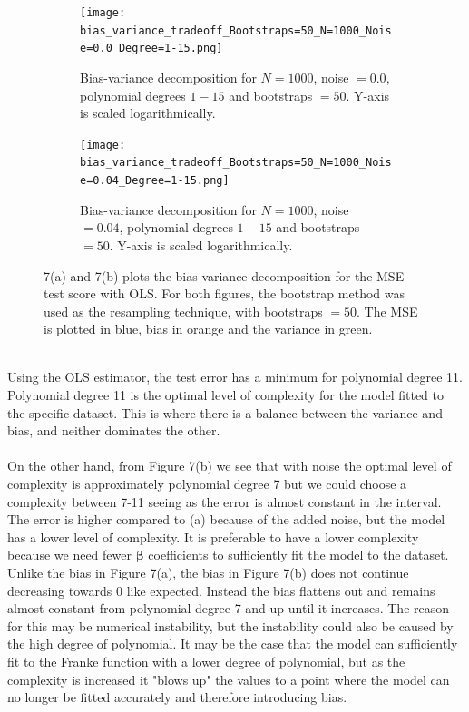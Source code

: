 \documentclass[a4paper,twocolumn]{article}
\newcommand{\B}{\boldsymbol{\beta}}
\begin{document}
\begin{figure}[ht]
    \centering
    \begin{subfigure}[b]{0.9\columnwidth}
        \texttt{[image: bias\_variance\_tradeoff\_Bootstraps=50\_N=1000\_Noise=0.0\_Degree=1-15.png]}
        \caption{Bias-variance decomposition for $N = 1000$, noise $= 0.0$, polynomial degrees $1- 15$ and bootstraps $= 50$. Y-axis is scaled logarithmically.}
    \end{subfigure}
    
    \begin{subfigure}[b]{0.9\columnwidth}
        \texttt{[image: bias\_variance\_tradeoff\_Bootstraps=50\_N=1000\_Noise=0.04\_Degree=1-15.png]}
        \caption{Bias-variance decomposition for $N = 1000$, noise $= 0.04$, polynomial degrees $1- 15$ and bootstraps $= 50$. Y-axis is scaled logarithmically.}
    \end{subfigure}
    \caption{7(a) and 7(b) plots the bias-variance decomposition for the MSE test score with OLS. For both figures, the bootstrap method was used as the resampling technique, with bootstraps $= 50$. The MSE is plotted in blue, bias in orange and the variance in green. }
\end{figure}\\
Using the OLS estimator, the test error has a minimum for polynomial degree 11. Polynomial degree 11 is the optimal level of complexity for the model fitted to the specific dataset. This is where there is a balance between the variance and bias, and neither dominates the other. \\
\\
On the other hand, from Figure 7(b) we see that with noise the optimal level of complexity is approximately polynomial degree 7 but we could choose a complexity between 7-11 seeing as the error is almost constant in the interval. The error is higher compared to (a) because of the added noise, but the model has a lower level of complexity. It is preferable to have a lower complexity because we need fewer $\B$ coefficients to sufficiently fit the model to the dataset.\\
Unlike the bias in Figure 7(a), the bias in Figure 7(b) does not continue decreasing towards 0 like expected. Instead the bias flattens out and remains almost constant from polynomial degree 7 and up until it increases. The reason for this may be numerical instability, but the instability could also be caused by the high degree of polynomial. It may be the case that the model can sufficiently fit to the Franke function with a lower degree of polynomial, but as the complexity is increased it "blows up" the values to a point where the model can no longer be fitted accurately and therefore introducing bias.\\
\end{document}
